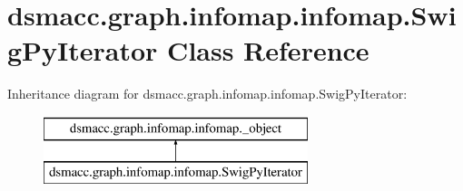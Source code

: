 \hypertarget{classdsmacc_1_1graph_1_1infomap_1_1infomap_1_1SwigPyIterator}{}\section{dsmacc.\+graph.\+infomap.\+infomap.\+Swig\+Py\+Iterator Class Reference}
\label{classdsmacc_1_1graph_1_1infomap_1_1infomap_1_1SwigPyIterator}
Inheritance diagram for dsmacc.\+graph.\+infomap.\+infomap.\+Swig\+Py\+Iterator\+:\begin{figure}[H]
\begin{center}
\leavevmode
\includegraphics[height=2.000000cm]{classdsmacc_1_1graph_1_1infomap_1_1infomap_1_1SwigPyIterator}
\end{center}
\end{figure}

